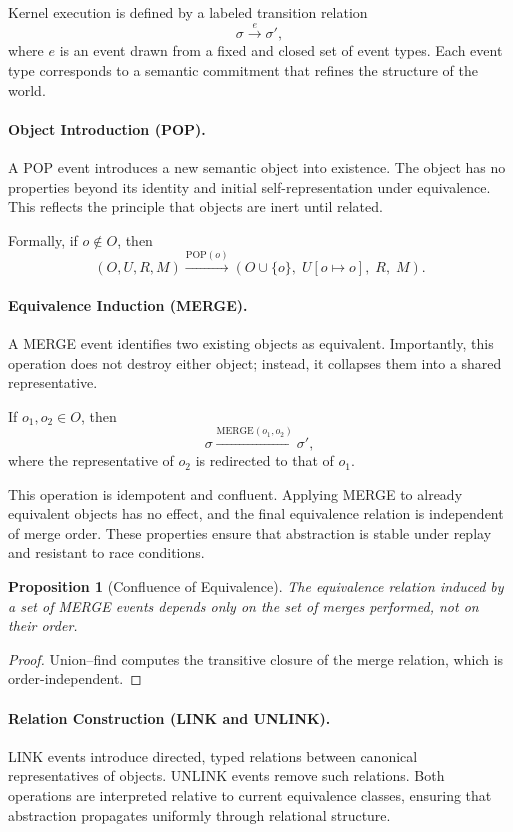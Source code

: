 \documentclass[11pt]{article}
\newtheorem{proposition}{Proposition}[section]
\begin{document}
Kernel execution is defined by a labeled transition relation
\[
\sigma \xrightarrow{e} \sigma',
\]
where $e$ is an event drawn from a fixed and closed set of event types. Each
event type corresponds to a semantic commitment that refines the structure
of the world.

\paragraph{Object Introduction (POP).}
A POP event introduces a new semantic object into existence. The object has
no properties beyond its identity and initial self-representation under
equivalence. This reflects the principle that objects are inert until
related.

Formally, if $o \notin O$, then
\[
(O, U, R, M) \xrightarrow{\mathrm{POP}(o)}
(O \cup \{o\},\; U[o \mapsto o],\; R,\; M).
\]

\paragraph{Equivalence Induction (MERGE).}
A MERGE event identifies two existing objects as equivalent. Importantly,
this operation does not destroy either object; instead, it collapses them
into a shared representative.

If $o_1, o_2 \in O$, then
\[
\sigma \xrightarrow{\mathrm{MERGE}(o_1,o_2)} \sigma',
\]
where the representative of $o_2$ is redirected to that of $o_1$.

This operation is idempotent and confluent. Applying MERGE to already
equivalent objects has no effect, and the final equivalence relation is
independent of merge order. These properties ensure that abstraction is
stable under replay and resistant to race conditions.

\begin{proposition}[Confluence of Equivalence]
The equivalence relation induced by a set of MERGE events depends only on the
set of merges performed, not on their order.
\end{proposition}

\begin{proof}
Union--find computes the transitive closure of the merge relation, which is
order-independent.
\end{proof}

\paragraph{Relation Construction (LINK and UNLINK).}
LINK events introduce directed, typed relations between canonical
representatives of objects. UNLINK events remove such relations. Both
operations are interpreted relative to current equivalence classes,
ensuring that abstraction propagates uniformly through relational structure.
\end{document}
